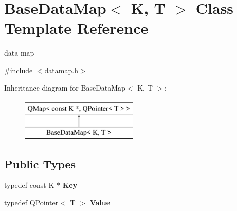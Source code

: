 \hypertarget{class_base_data_map}{}\section{Base\+Data\+Map$<$ K, T $>$ Class Template Reference}
\label{class_base_data_map}


data map  




{\ttfamily \#include $<$datamap.\+h$>$}

Inheritance diagram for Base\+Data\+Map$<$ K, T $>$\+:\begin{figure}[H]
\begin{center}
\leavevmode
\includegraphics[height=2.000000cm]{class_base_data_map}
\end{center}
\end{figure}
\subsection*{Public Types}
\begin{DoxyCompactItemize}
\item 
\mbox{\label{class_base_data_map_ad99faa3c84d64997ea893352d1e1680e}} 
typedef const K $\ast$ {\bfseries Key}
\item 
\mbox{\label{class_base_data_map_a0bf849e9741230d301f380d8b3c921af}} 
typedef Q\+Pointer$<$ T $>$ {\bfseries Value}
\end{DoxyCompactItemize}
